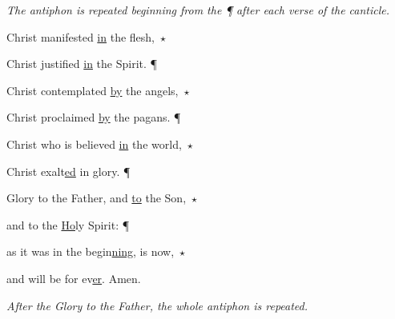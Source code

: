 \emph{The antiphon is repeated beginning from the \emph{¶} after each verse of the canticle.} \vspace{5pt}

\noindent Christ manifested \uline{in} the flesh,~$\star$~\nopagebreak

Christ justified \uline{in} the Spirit. ¶

\noindent Christ contemplated \uline{by} the angels,~$\star$~\nopagebreak

Christ proclaimed \uline{by} the pagans. ¶

\noindent Christ who is believed \uline{in} the world,~$\star$~\nopagebreak

Christ exalt\uline{ed} in glory. ¶

\noindent Glory to the Father, and \uline{to} the Son,~$\star$~\nopagebreak

and to the \uline{Ho}ly Spirit: ¶

\noindent as it was in the begin\uline{ning}, is now,~$\star$~\nopagebreak

and will be for ev\uline{er}. Amen.

\vspace{5pt} \emph{After the \emph{Glory to the Father,} the whole antiphon is repeated.}
